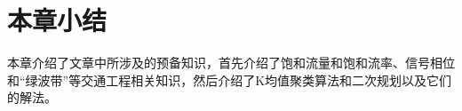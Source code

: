 
%


\section{本章小结}
本章介绍了文章中所涉及的预备知识，首先介绍了饱和流量和饱和流率、信号相位和“绿波带”等交通工程相关知识，然后介绍了K均值聚类算法和二次规划以及它们的解法。
\label{ch2}



